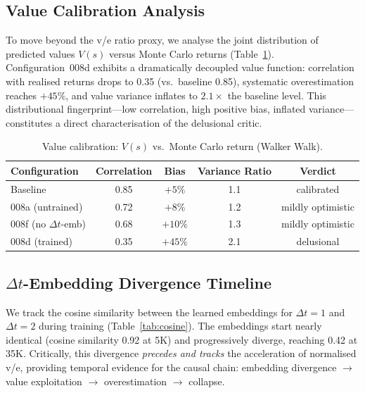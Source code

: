 \documentclass[letterpaper]{article}
\begin{document}
\subsection{Value Calibration Analysis}
\label{sec:value-calibration}

To move beyond the v/e ratio proxy, we analyse the joint distribution of predicted values $V(s)$ versus Monte Carlo returns (Table~\ref{tab:value-calib}).
Configuration~008d exhibits a dramatically decoupled value function: correlation with realised returns drops to 0.35 (vs.\ baseline 0.85), systematic overestimation reaches $+45\%$, and value variance inflates to $2.1\times$ the baseline level.
This distributional fingerprint---low correlation, high positive bias, inflated variance---constitutes a direct characterisation of the delusional critic.

\begin{table}[h]
\centering
\caption{Value calibration: $V(s)$ vs.\ Monte Carlo return (Walker Walk).}
\label{tab:value-calib}
\begin{tabular}{lcccc}
\toprule
Configuration & Correlation & Bias & Variance Ratio & Verdict \\
\midrule
Baseline & 0.85 & $+5\%$ & 1.1 & calibrated \\
008a (untrained) & 0.72 & $+8\%$ & 1.2 & mildly optimistic \\
008f (no $\Delta t$-emb) & 0.68 & $+10\%$ & 1.3 & mildly optimistic \\
008d (trained) & 0.35 & $+45\%$ & 2.1 & delusional \\
\bottomrule
\end{tabular}
\end{table}

\subsection{$\Delta t$-Embedding Divergence Timeline}
\label{sec:cosine}

We track the cosine similarity between the learned embeddings for $\Delta t{=}1$ and $\Delta t{=}2$ during training (Table~\ref{tab:cosine}).
The embeddings start nearly identical (cosine similarity 0.92 at 5K) and progressively diverge, reaching 0.42 at 35K.
Critically, this divergence \emph{precedes and tracks} the acceleration of normalised v/e, providing temporal evidence for the causal chain: embedding divergence $\to$ value exploitation $\to$ overestimation $\to$ collapse.
\end{document}
